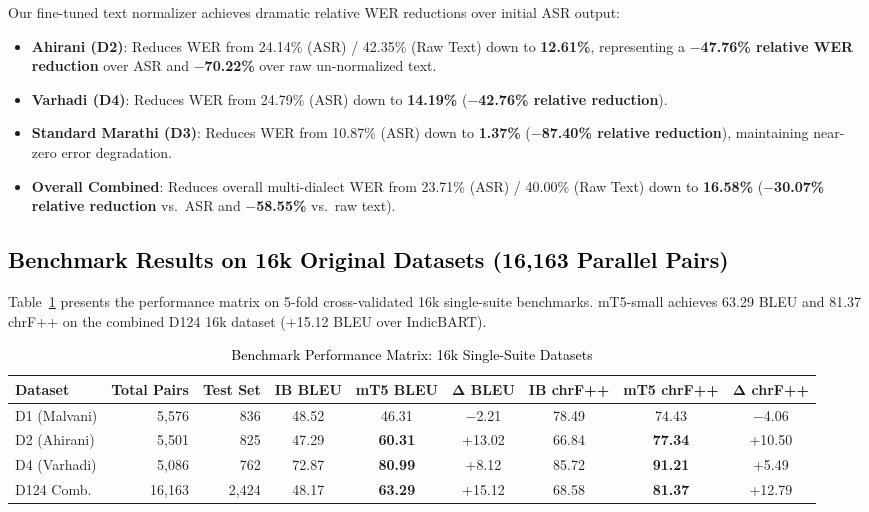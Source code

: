 Our fine-tuned text normalizer achieves dramatic relative WER reductions over initial ASR output:
\begin{itemize}
    \item \textbf{Ahirani (D2)}: Reduces WER from 24.14\% (ASR) / 42.35\% (Raw Text) down to \textbf{12.61\%}, representing a \textbf{$-$47.76\% relative WER reduction} over ASR and \textbf{$-$70.22\%} over raw un-normalized text.
    \item \textbf{Varhadi (D4)}: Reduces WER from 24.79\% (ASR) down to \textbf{14.19\%} (\textbf{$-$42.76\% relative reduction}).
    \item \textbf{Standard Marathi (D3)}: Reduces WER from 10.87\% (ASR) down to \textbf{1.37\%} (\textbf{$-$87.40\% relative reduction}), maintaining near-zero error degradation.
    \item \textbf{Overall Combined}: Reduces overall multi-dialect WER from 23.71\% (ASR) / 40.00\% (Raw Text) down to \textbf{16.58\%} (\textbf{$-$30.07\% relative reduction} vs.\ ASR and \textbf{$-$58.55\%} vs.\ raw text).
\end{itemize}

\subsection{\textcolor{black}{Benchmark Results on 16k Original Datasets (16,163 Parallel Pairs)}}

Table~\ref{tab:results_16k} presents the performance matrix on 5-fold cross-validated 16k single-suite benchmarks. mT5-small achieves 63.29 BLEU and 81.37 chrF++ on the combined D124 16k dataset (+15.12 BLEU over IndicBART).

\begin{table}[t]
\color{black}
\centering
\caption{\textcolor{black}{Benchmark Performance Matrix: 16k Single-Suite Datasets}}
\label{tab:results_16k}
\begin{tabular}{lrrcccccc}
\hline
\textbf{Dataset} & \textbf{Total Pairs} & \textbf{Test Set} & \textbf{IB BLEU} & \textbf{mT5 BLEU} & $\boldsymbol{\Delta}$\textbf{ BLEU} & \textbf{IB chrF++} & \textbf{mT5 chrF++} & $\boldsymbol{\Delta}$\textbf{ chrF++} \\
\hline
D1 (Malvani) & 5,576 & 836 & 48.52 & 46.31 & $-$2.21 & 78.49 & 74.43 & $-$4.06 \\
D2 (Ahirani) & 5,501 & 825 & 47.29 & \textbf{60.31} & +13.02 & 66.84 & \textbf{77.34} & +10.50 \\
D4 (Varhadi) & 5,086 & 762 & 72.87 & \textbf{80.99} & +8.12 & 85.72 & \textbf{91.21} & +5.49 \\
\hline
D124 Comb. & 16,163 & 2,424 & 48.17 & \textbf{63.29} & +15.12 & 68.58 & \textbf{81.37} & +12.79 \\
\hline
\end{tabular}
\end{table}

